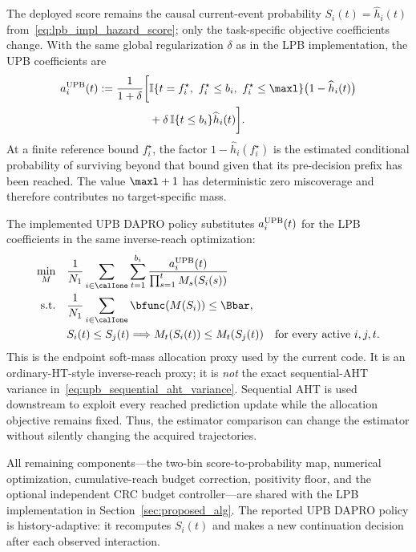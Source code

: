 The deployed score remains the causal current-event probability
$S_i(t)=\widehat h_i(t)$ from~\eqref{eq:lpb_impl_hazard_score}; only the
task-specific objective coefficients change. With the same global
regularization $\delta$ as in the LPB implementation, the UPB coefficients are
\begin{equation}
\begin{split}
    a_i^{\rm UPB}(t)
    :=\frac{1}{1+\delta}\biggl[&
      \mathbb I\{t=f_i^\star,\ f_i^\star\leq b_i,\ f_i^\star\leq\maxl\}
      \bigl(1-\widehat h_i(t)\bigr)\\
      &+\delta\,\mathbb I\{t\leq b_i\}\widehat h_i(t)
    \biggr].
    \label{eq:upb_dapro_soft_coefficients}
\end{split}
\end{equation}
At a finite reference bound $f_i^\star$, the factor
$1-\widehat h_i(f_i^\star)$ is the estimated conditional probability of
surviving beyond that bound given that its pre-decision prefix has been
reached. The value $\maxl+1$ has deterministic zero miscoverage and therefore
contributes no target-specific mass.

The implemented UPB DAPRO policy substitutes
$a_i^{\rm UPB}(t)$ for the LPB coefficients in the same inverse-reach
optimization:
\begin{equation}
\begin{aligned}
    \min_M\quad &
    \frac{1}{N_1}\sum_{i\in\calIone}\sum_{t=1}^{b_i}
    \frac{a_i^{\rm UPB}(t)}{\prod_{s=1}^{t}M_s(S_i(s))}\\
    \text{s.t.}\quad &
    \frac{1}{N_1}\sum_{i\in\calIone}\bfunc(M(S_i))\leq\Bbar,\\
    &S_i(t)\leq S_j(t)
      \Longrightarrow M_t(S_i(t))\leq M_t(S_j(t))
      \quad\text{for every active }i,j,t.
    \label{eq:upb_dapro_objective}
\end{aligned}
\end{equation}
This is the endpoint soft-mass allocation proxy used by the current code. It
is an ordinary-HT-style inverse-reach proxy; it is \emph{not} the exact
sequential-AHT variance in~\eqref{eq:upb_sequential_aht_variance}. Sequential
AHT is used downstream to exploit every reached prediction update while the
allocation objective remains fixed. Thus, the estimator comparison can change
the estimator without silently changing the acquired trajectories.

All remaining components---the two-bin score-to-probability map, numerical
optimization, cumulative-reach budget correction, positivity floor, and the
optional independent CRC budget controller---are shared with the LPB
implementation in Section~\ref{sec:proposed_alg}. The reported UPB DAPRO
policy is history-adaptive: it recomputes $S_i(t)$ and makes a new continuation
decision after each observed interaction.
